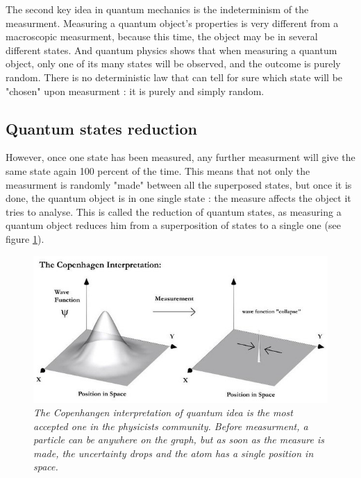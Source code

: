 \documentclass[a4paper,12pt]{report}
\newcommand{\para}[1]{\par{#1}\\}
\begin{document}
\para{
    The second key idea in quantum mechanics is the indeterminism of the measurment. Measuring a quantum object's properties is very different from a macroscopic measurment, because this time, the object may be in several different states. And quantum physics shows that when measuring a quantum object, only one of its many states will be observed, and the outcome is purely random. There is no deterministic law that can tell for sure which state will be "chosen" upon measurment : it is purely and simply random.
}

        \subsection{Quantum states reduction} \label{reduction}

\para{
    However, once one state has been measured, any further measurment will give the same state again 100 percent of the time. This means that not only the measurment is randomly "made" between all the superposed states, but once it is done, the quantum object is in one single state : the measure affects the object it tries to analyse. This is called the reduction of quantum states, as measuring a quantum object reduces him from a superposition of states to a single one (see figure \ref{copenhagen}).
}

\begin{figure}
	\begin{center}
		\includegraphics[scale=0.6]{images/copenhagen}
	\end{center}
	\caption{\textit{The Copenhangen interpretation of quantum idea is the most accepted one in the physicists community. Before measurment, a particle can be anywhere on the graph, but as soon as the measure is made, the uncertainty drops and the atom has a single position in space.}}
	\label{copenhagen}
\end{figure}
\end{document}
